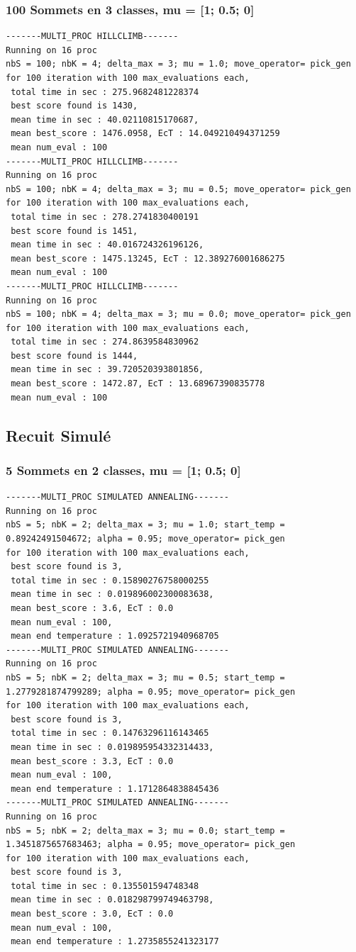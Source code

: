\documentclass[a4paper]{article}
\begin{document}
\subsubsection{100 Sommets en 3 classes, mu = [1; 0.5; 0]}
\begin{verbatim}
-------MULTI_PROC HILLCLIMB-------
Running on 16 proc
nbS = 100; nbK = 4; delta_max = 3; mu = 1.0; move_operator= pick_gen
for 100 iteration with 100 max_evaluations each, 
 total time in sec : 275.9682481228374
 best score found is 1430,
 mean time in sec : 40.02110815170687,
 mean best_score : 1476.0958, EcT : 14.049210494371259
 mean num_eval : 100
-------MULTI_PROC HILLCLIMB-------
Running on 16 proc
nbS = 100; nbK = 4; delta_max = 3; mu = 0.5; move_operator= pick_gen
for 100 iteration with 100 max_evaluations each, 
 total time in sec : 278.2741830400191
 best score found is 1451,
 mean time in sec : 40.016724326196126,
 mean best_score : 1475.13245, EcT : 12.389276001686275
 mean num_eval : 100
-------MULTI_PROC HILLCLIMB-------
Running on 16 proc
nbS = 100; nbK = 4; delta_max = 3; mu = 0.0; move_operator= pick_gen
for 100 iteration with 100 max_evaluations each, 
 total time in sec : 274.8639584830962
 best score found is 1444,
 mean time in sec : 39.720520393801856,
 mean best_score : 1472.87, EcT : 13.68967390835778
 mean num_eval : 100
\end{verbatim}

\subsection{Recuit Simulé}
\subsubsection{5 Sommets en 2 classes, mu = [1; 0.5; 0]}
\begin{verbatim}
-------MULTI_PROC SIMULATED ANNEALING-------
Running on 16 proc
nbS = 5; nbK = 2; delta_max = 3; mu = 1.0; start_temp = 0.89242491504672; alpha = 0.95; move_operator= pick_gen
for 100 iteration with 100 max_evaluations each, 
 best score found is 3,
 total time in sec : 0.15890276758000255
 mean time in sec : 0.019896002300083638,
 mean best_score : 3.6, EcT : 0.0
 mean num_eval : 100,
 mean end temperature : 1.0925721940968705
-------MULTI_PROC SIMULATED ANNEALING-------
Running on 16 proc
nbS = 5; nbK = 2; delta_max = 3; mu = 0.5; start_temp = 1.2779281874799289; alpha = 0.95; move_operator= pick_gen
for 100 iteration with 100 max_evaluations each, 
 best score found is 3,
 total time in sec : 0.14763296116143465
 mean time in sec : 0.019895954332314433,
 mean best_score : 3.3, EcT : 0.0
 mean num_eval : 100,
 mean end temperature : 1.1712864838845436
-------MULTI_PROC SIMULATED ANNEALING-------
Running on 16 proc
nbS = 5; nbK = 2; delta_max = 3; mu = 0.0; start_temp = 1.3451875657683463; alpha = 0.95; move_operator= pick_gen
for 100 iteration with 100 max_evaluations each, 
 best score found is 3,
 total time in sec : 0.135501594748348
 mean time in sec : 0.018298799749463798,
 mean best_score : 3.0, EcT : 0.0
 mean num_eval : 100,
 mean end temperature : 1.2735855241323177
\end{verbatim}
\end{document}
